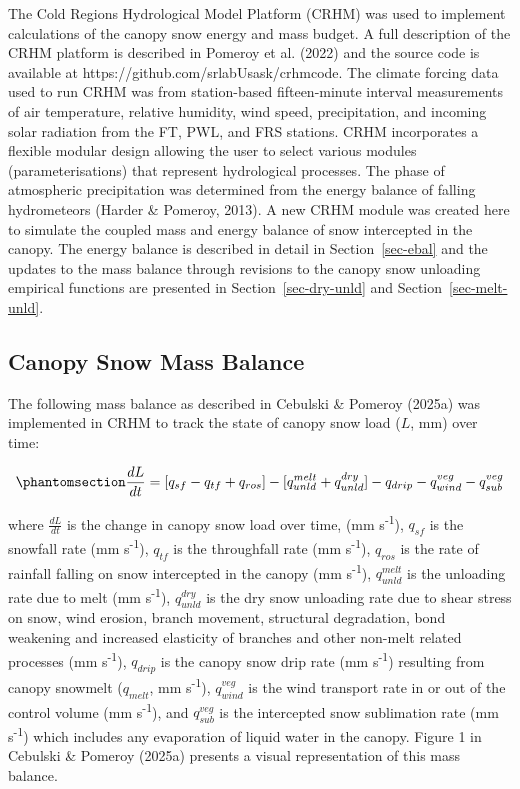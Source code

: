 \documentclass[
  letterpaper,
]{tex/uofsthesis-cs}
\begin{document}
The Cold Regions Hydrological Model Platform (CRHM) was used to
implement calculations of the canopy snow energy and mass budget. A full
description of the CRHM platform is described in Pomeroy et al. (2022)
and the source code is available at
https://github.com/srlabUsask/crhmcode. The climate forcing data used to
run CRHM was from station-based fifteen-minute interval measurements of
air temperature, relative humidity, wind speed, precipitation, and
incoming solar radiation from the FT, PWL, and FRS stations. CRHM
incorporates a flexible modular design allowing the user to select
various modules (parameterisations) that represent hydrological
processes. The phase of atmospheric precipitation was determined from
the energy balance of falling hydrometeors (Harder \& Pomeroy, 2013). A
new CRHM module was created here to simulate the coupled mass and energy
balance of snow intercepted in the canopy. The energy balance is
described in detail in Section~\ref{sec-ebal} and the updates to the
mass balance through revisions to the canopy snow unloading empirical
functions are presented in Section~\ref{sec-dry-unld} and
Section~\ref{sec-melt-unld}.

\subsection{Canopy Snow Mass Balance}\label{sec-mbal}

The following mass balance as described in Cebulski \& Pomeroy (2025a)
was implemented in CRHM to track the state of canopy snow load (\(L\),
mm) over time:

\begin{equation}\phantomsection\label{eq-canopy-mass-bal}{
\frac{dL}{dt} = 
[q_{sf} - q_{tf} + q_{ros}] - [q_{unld}^{melt} + q_{unld}^{dry}] - q_{drip} - q_{wind}^{veg} - q_{sub}^{veg}
}\end{equation}

where \(\frac{dL}{dt}\) is the change in canopy snow load over time, (mm
s\textsuperscript{-1}), \(q_{sf}\) is the snowfall rate (mm
s\textsuperscript{-1}), \(q_{tf}\) is the throughfall rate (mm
s\textsuperscript{-1}), \(q_{ros}\) is the rate of rainfall falling on
snow intercepted in the canopy (mm s\textsuperscript{-1}),
\(q_{unld}^{melt}\) is the unloading rate due to melt (mm
s\textsuperscript{-1}), \(q_{unld}^{dry}\) is the dry snow unloading
rate due to shear stress on snow, wind erosion, branch movement,
structural degradation, bond weakening and increased elasticity of
branches and other non-melt related processes (mm
s\textsuperscript{-1}), \(q_{drip}\) is the canopy snow drip rate (mm
s\textsuperscript{-1}) resulting from canopy snowmelt (\(q_{melt}\), mm
s\textsuperscript{-1}), \(q_{wind}^{veg}\) is the wind transport rate in
or out of the control volume (mm s\textsuperscript{-1}), and
\(q_{sub}^{veg}\) is the intercepted snow sublimation rate (mm
s\textsuperscript{-1}) which includes any evaporation of liquid water in
the canopy. Figure 1 in Cebulski \& Pomeroy (2025a) presents a visual
representation of this mass balance.
\end{document}
